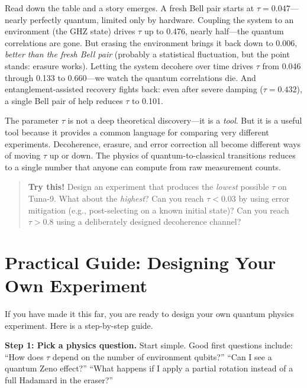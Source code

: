 \documentclass[amsmath,amssymb,reprint,aps,prb]{revtex4-2}
\begin{document}
Read down the table and a story emerges.  A fresh Bell pair starts
at $\tau = 0.047$---nearly perfectly quantum, limited only by
hardware.  Coupling the system to an environment (the GHZ state)
drives $\tau$ up to 0.476, nearly half---the quantum correlations
are gone.  But erasing the environment brings it back down to
0.006, \emph{better than the fresh Bell pair} (probably a
statistical fluctuation, but the point stands: erasure works).
Letting the system decohere over time drives $\tau$ from 0.046
through 0.133 to 0.660---we watch the quantum correlations die.
And entanglement-assisted recovery fights back: even after severe
damping ($\tau = 0.432$), a single Bell pair of help reduces $\tau$
to 0.101.

The parameter $\tau$ is not a deep theoretical discovery---it is
a \emph{tool}.  But it is a useful tool because it provides a
common language for comparing very different experiments.
Decoherence, erasure, and error correction all become different
ways of moving $\tau$ up or down.  The physics of quantum-to-classical
transitions reduces to a single number that anyone can compute from
raw measurement counts.

\begin{quote}
\textbf{Try this!}  Design an experiment that produces the
\emph{lowest} possible $\tau$ on Tuna-9.  What about the
\emph{highest}?  Can you reach $\tau < 0.03$ by using error
mitigation (e.g., post-selecting on a known initial state)?
Can you reach $\tau > 0.8$ using a deliberately designed
decoherence channel?
\end{quote}


\section{Practical Guide: Designing Your Own Experiment}
\label{sec:guide}

If you have made it this far, you are ready to design your own
quantum physics experiment.  Here is a step-by-step guide.

\textbf{Step 1: Pick a physics question.}  Start simple.
Good first questions include: ``How does $\tau$ depend on the
number of environment qubits?''  ``Can I see a quantum Zeno
effect?''  ``What happens if I apply a partial rotation instead
of a full Hadamard in the eraser?''
\end{document}
